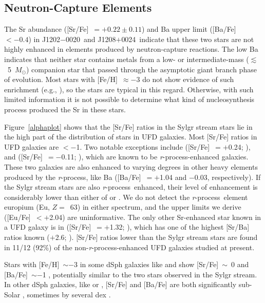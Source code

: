 \documentclass[twocolumn,tighten]{aastex62}
\newcommand{\jtwo}{J1202$-$0020}
\newcommand{\jeight}{J1208$+$0024}
\newcommand{\msun}{\mbox{$M_{\odot}$}}
\newcommand{\rpro}{\mbox{{\it r}-process}}
\begin{document}
\subsection{Neutron-Capture Elements}
\label{cluesncap}


The Sr abundance
([Sr/Fe]~$= +0.22 \pm 0.11$)
and Ba upper limit 
([Ba/Fe]~$< -0.4$)
in \jtwo\ and \jeight\
indicate that these two stars are not highly enhanced
in elements produced by neutron-capture reactions.
The low Ba indicates that
neither star contains metals from a
low- or intermediate-mass ($\lesssim$~5~\msun)
companion star that passed through the
asymptotic giant branch phase of evolution.
Most stars with [Fe/H]~$\approx -3$
do not show evidence of such enrichment
(e.g., \citealt{jacobson15smss}),
so the stars are typical in this regard.
Otherwise, with such limited information 
it is not possible to determine 
what kind of nucleosynthesis process
produced the Sr in these stars.

Figure~\ref{alphaplot} shows that the [Sr/Fe] ratios
in the Sylgr stream stars
lie in the high part of the
distribution of stars in UFD galaxies.
Most [Sr/Fe] ratios in UFD galaxies are $< -$1.
Two notable exceptions include
([Sr/Fe]~$= +$0.24; \citealt{ji16ret2}),
and 
([Sr/Fe]~$=-$0.11; 
\citealt{hansen17tuc3,marshall19}),
which are known to be \rpro-enhanced galaxies.
These two galaxies are also enhanced to varying degrees
in other heavy elements produced by the \rpro, like Ba
([Ba/Fe]~$= +$1.04 and
$-$0.03, respectively).
If the Sylgr stream stars are also \rpro\ enhanced, 
their level of enhancement is considerably lower than either of 
\object[NAME Reticulum II]{Ret~II} or
.
We do not detect the \rpro\ element europium (Eu, $Z =$~63) 
in either spectrum,
and the upper limits we derive ([Eu/Fe]~$< +$2.04)
are uninformative.
The only other Sr-enhanced star known in a UFD galaxy
is in 
([Sr/Fe]~$= +$1.32; \citealt{francois16}),
which has one of the highest [Sr/Ba] ratios known
($+$2.6; \citealt{francois16}).
[Sr/Fe] ratios lower than the Sylgr stream stars
are found in 11/12 (92\%) 
of the non-\rpro-enhanced 
UFD galaxies studied at present.

Stars with [Fe/H]~$\sim -$3 in some dSph galaxies like 
 and
show [Sr/Fe]~$\sim$~0 and 
[Ba/Fe]~$\sim -$1
\citep{cohen10umi,tafelmeyer10,kirby12},
potentially similar to the two stars observed in the Sylgr stream.
In other dSph galaxies, like
 or
,
[Sr/Fe] and [Ba/Fe] are both significantly sub-Solar
\citep{cohen09dra,venn12},
sometimes by several dex
\citep{fulbright04dra}.
\end{document}
